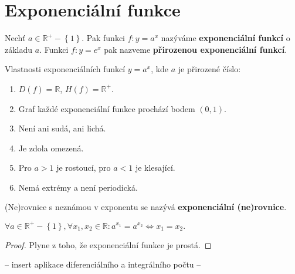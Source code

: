 \section{Exponenciální funkce}
\begin{definition}
    Nechť $a\in \mathbb R^+ - \left \{ 1 \right \}. $ Pak funkci $f:y=a^x$
    nazýváme \textbf{exponenciální funkcí} o základu $a$. Funkci $f:y=e^x$ pak
    nazveme \textbf{přirozenou exponenciální funkcí}.
\end{definition}

\begin{veta}
    Vlastnosti exponenciálních funkcí $y= a^x$, kde $a$ je přirozené číslo:
    \begin{enumerate}[$i.$]
        \item $D(f)= \mathbb R$, $H(f)= \mathbb R^+$.
       	\item Graf každé exponenciální funkce prochází bodem $(0,1).$
        \item Není ani sudá, ani lichá.
        \item Je zdola omezená.
        \item Pro $a >1$ je rostoucí, pro $a<1$ je klesající.
        \item Nemá extrémy a není periodická.
    \end{enumerate}
\end{veta}

\begin{definition}
    (Ne)rovnice s neznámou v exponentu se nazývá \textbf{exponenciální (ne)rovnice}.
\end{definition}

\begin{veta}
    $\forall a \in \mathbb R^+ - \left \{ 1 \right \}, \forall x_1, x_2
    \in \mathbb R: a^{x_1}=a^{x_2}\iff x_1=x_2.$
\end{veta}

\begin{proof}
    Plyne z toho, že exponenciální funkce je prostá.
\end{proof}

-- insert aplikace diferenciálního a integrálního počtu --
